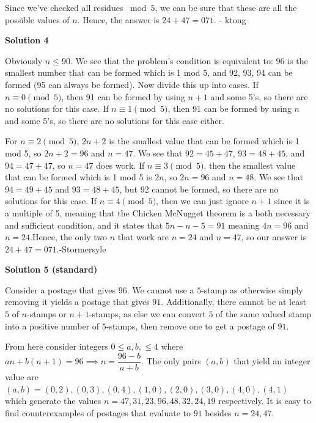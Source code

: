 \begin{enumerate}
 Since we've checked all residues $\bmod 5$, we can be sure that these are all the possible values of $n$. Hence, the answer is $24+47=\boxed{071}$. - ktong

 



\textbf{Solution 4}

Obviously $n\le 90$. We see that the problem's condition is equivalent to: 96 is the smallest number that can be formed which is 1 mod 5, and 92, 93, 94 can be formed (95 can always be formed). Now divide this up into cases. If $n\equiv 0\pmod{5}$, then 91 can be formed by using $n+1$ and some 5's, so there are no solutions for this case. If $n\equiv 1\pmod{5}$, then 91 can be formed by using $n$ and some 5's, so there are no solutions for this case either.

 For $n\equiv 2\pmod{5}$, $2n+2$ is the smallest value that can be formed which is 1 mod 5, so $2n+2=96$ and $n=47$. We see that $92=45+47$, $93=48+45$, and $94=47+47$, so $n=47$ does work. If $n\equiv 3\pmod{5}$, then the smallest value that can be formed which is 1 mod 5 is $2n$, so $2n=96$ and $n=48$. We see that $94=49+45$ and $93=48+45$, but 92 cannot be formed, so there are no solutions for this case. If $n\equiv 4\pmod{5}$, then we can just ignore $n+1$ since it is a multiple of 5, meaning that the Chicken McNugget theorem is a both necessary and sufficient condition, and it states that $5n-n-5=91$ meaning $4n=96$ and $n=24$.Hence, the only two $n$ that work are $n=24$ and $n=47$, so our answer is $24+47=\boxed{071}$.-Stormersyle

 



\textbf{Solution 5 (standard)}

Consider a postage that gives $96$. We cannot use a $5$-stamp as otherwise simply removing it yields a postage that gives $91$. Additionally, there cannot be at least $5$ of $n$-stamps or $n + 1$-stamps, as else we can convert $5$ of the same valued stamp into a positive number of $5$-stamps, then remove one to get a postage of $91$.

 
From here consider integers $0 \le a, b, \le 4$ where $an + b(n + 1) = 96 \implies n = \dfrac{96 - b}{a + b}$. The only pairs $(a, b)$ that yield an integer value are $(a, b) = (0, 2), (0, 3), (0, 4), (1, 0), (2, 0), (3, 0), (4, 0), (4, 1)$ which generate the values $n = 47, 31, 23, 96, 48, 32, 24, 19$ respectively. It is easy to find counterexamples of postages that evaluate to $91$ besides $n = 24, 47$. 


\end{enumerate}
